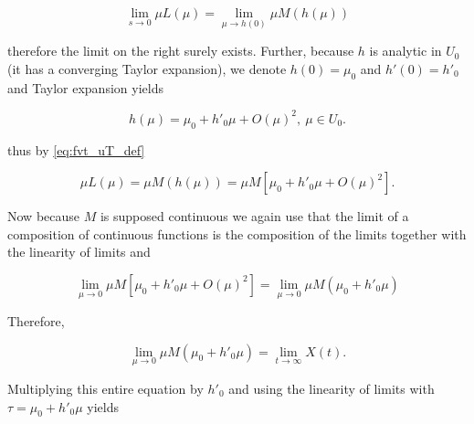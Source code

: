 \begin{equation} \lim\limits_{s\to 0} \mu L\left(\mu\right) = \lim\limits_{\mu\to h(0)} \mu M\left(h\left(\mu\right)\right) \end{equation}

	\noindent therefore the limit on the right surely exists. Further, because $h$ is analytic in $U_0$ (it has a converging Taylor expansion), we denote $h(0) = \mu_0$ and $h'(0) = h'_0$ and Taylor expansion yields

\begin{equation} h(\mu) = \mu_0 + h'_0\mu + O\left(\mu\right)^2,\ \mu \in U_0. \end{equation}

	\noindent thus by \eqref{eq:fvt_uT_def}

\begin{equation}
	\mu L\left(\mu\right) = \mu M\left(h\left(\mu\right)\right) = \mu M\left[\mu_0 + h'_0\mu + O\left(\mu\right)^2\right].
\end{equation}

	Now because $M$ is supposed continuous we again use that the limit of a composition of continuous functions is the composition of the limits together with the linearity of limits and

\begin{equation} \lim\limits_{\mu\to 0} \mu M\left[\mu_0 + h'_0\mu + O\left(\mu\right)^2\right] = \lim\limits_{\mu\to 0} \mu M\left(\mu_0 + h'_0\mu\right) \end{equation}

	Therefore,

\begin{equation} \lim\limits_{\mu\to 0} \mu M\left(\mu_0 + h'_0\mu\right) = \lim\limits_{t\to\infty} X(t). \label{eq:fvt_uT_2}\end{equation}

	Multiplying this entire equation by $h'_0$ and using the linearity of limits with $\tau = \mu_0 + h'_0\mu$ yields

